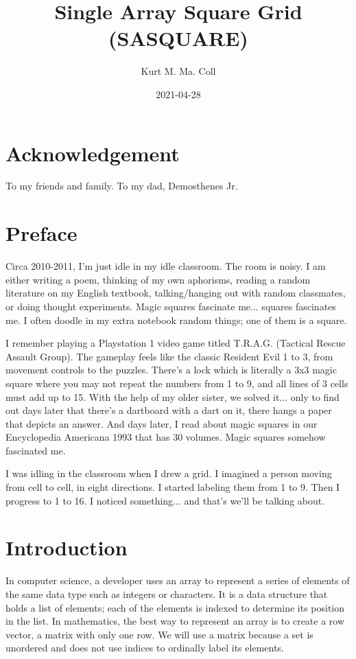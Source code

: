 \documentclass[twoside,openany,12pt]{book}
\title{Single Array Square Grid (SASQUARE)}
\date{2021-04-28}
\author{Kurt M. Ma. Coll}
\begin{document}

    \maketitle
    \newpage

    \chapter*{Acknowledgement} %
    \label{cha:acknowledgement}
    To my friends and family. To my dad, Demosthenes Jr.

    \newpage

    \tableofcontents
    \newpage

    \chapter*{Preface}
    Circa 2010-2011, I'm just idle in my idle classroom. The room is noisy. I am either writing a poem, thinking of my own aphorisms, reading a random literature on my English textbook, talking/hanging out with random classmates, or doing thought experiments. Magic squares fascinate me... squares fascinates me. I often doodle in my extra notebook random things; one of them is a square.

    I remember playing a Playstation 1 video game titled T.R.A.G. (Tactical Rescue Assault Group). The gameplay feels like the classic Resident Evil 1 to 3, from movement controls to the puzzles. There's a lock which is literally a 3x3 magic square where you may not repeat the numbers from 1 to 9, and all lines of 3 cells must add up to 15. With the help of my older sister, we solved it... only to find out days later that there's a dartboard with a dart on it, there hangs a paper that depicts an answer. And days later, I read about magic squares in our Encyclopedia Americana 1993 that has 30 volumes. Magic squares somehow fascinated me.

    I was idling in the classroom when I drew a grid. I imagined a person moving from cell to cell, in eight directions. I started labeling them from 1 to 9. Then I progress to 1 to 16. I noticed something... and that's we'll be talking about.

    \newpage

    \chapter*{Introduction}
    In computer science, a developer uses an array to represent a series of elements of the same data type such as integers or characters. It is a data structure that holds a list of elements; each of the elements is indexed to determine its position in the list. In mathematics, the best way to represent an array is to create a row vector, a matrix with only one row. We will use a matrix because a set is unordered and does not use indices to ordinally label its elements.
\end{document}
